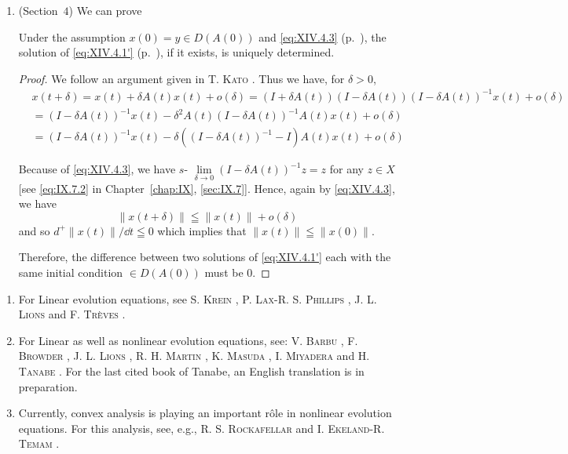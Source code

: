 \begin{enumerate}[1.]
\item (Section~\hyperref[sec:XIV.4]{$4$}) We can prove 

\begin{theoremn}\label{thm:notes.XIV.4.1prime} Under the assumption $x(0) = y \in D(A(0))$ and \eqref{eq:XIV.4.3} (p.~\pageref{eq:XIV.4.3}), the solution of \eqref{eq:XIV.4.1'} (p.~\pageref{eq:XIV.4.1'}), if it exists, is uniquely determined.
\end{theoremn}

\begin{proof}
 We follow an argument given in T. \textsc{Kato} \cite{kato136}. Thus we have, for $\delta > 0$, 
\[ \begin{aligned}
&x (t + \delta)  = x (t) + \delta A (t) x (t) + o (\delta) = (I + \delta A (t)) (I - \delta A (t)) (I - \delta A (t)) ^{-1} x (t) + o (\delta) \\
&= (I - \delta A (t)) ^{-1} x (t) - \delta^{2} A (t) (I - \delta A (t)) ^{-1} A (t) x (t) + o (\delta) \\
&= (I - \delta A (t)) ^{-1} x (t) - \delta ((I - \delta A (t)) ^{-1} - I) A (t) x (t) + o (\delta)
\end{aligned}
\]

Because of \eqref{eq:XIV.4.3}, we have $s\text{- }\lim\limits_{\delta \to 0} (I - \delta A(t))^{-1} z = z$ for any $z \in X$ [see \eqref{eq:IX.7.2} in Chapter~\ref{chap:IX}, \ref{sec:IX.7}]. Hence, again by \eqref{eq:XIV.4.3}, we have 
\[
\left\| x (t + \delta) \right\| \leqq \left\| x (t) \right\| + o (\delta)
\]
and so $d^{+}\|x(t)\| / \dd t \leqq 0$ which implies that $\|x(t)\| \leqq \|x(0)\|$. 

Therefore, the difference between two solutions of \eqref{eq:XIV.4.1'} each with the same initial condition $\in D(A(0))$ must be $0$. 
\end{proof}
\end{enumerate}

\label{notes:IX-XIV}

\begin{enumerate}[1.]
\item For Linear evolution equations, see S. \textsc{Krein} \cite{krein168}, P. \textsc{Lax}-R. S. \textsc{Phillips} \cite{lewy174}, J. L. \textsc{Lions} \cite{liggett182} and F. \textsc{Trèves} \cite{trotter326}.
\item For Linear as well as nonlinear evolution equations, see: V. \textsc{Barbu} \cite{barbu11}, F. \textsc{Browder} \cite{browder31}, J. L. \textsc{Lions} \cite{liggett182}, R. H. \textsc{Martin} \cite{martin188}, K. \textsc{Masuda} \cite{masuda190}, I. \textsc{Miyadera} \cite{miyadera207} and H. \textsc{Tanabe} \cite{tanabe319}. For the last cited book of Tanabe, an English translation is in preparation.
\item Currently, convex analysis is playing an important rôle in nonlinear evolution equations. For this analysis, see, e.g., R. S. \textsc{Rockafellar} \cite{rockafeller278} and I. \textsc{Ekeland}-R. \textsc{Temam} \cite{ekeland54}.
\end{enumerate}


